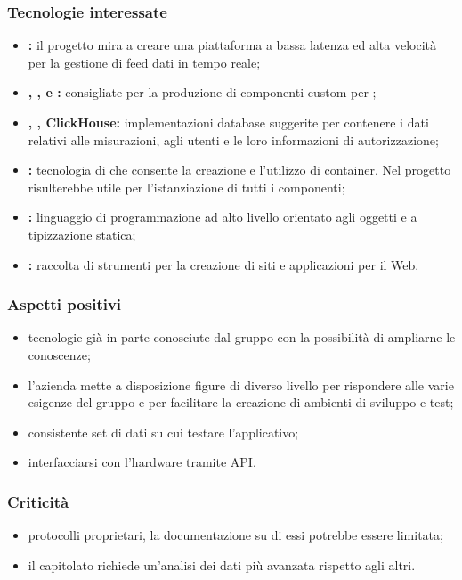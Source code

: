 	\subsubsection{Tecnologie interessate}
	\begin{itemize}
		\item \textbf{:} il progetto mira a creare una piattaforma a bassa latenza ed alta velocità per la gestione di feed dati in tempo reale;
		\item \textbf{, ,  e :}  consigliate per la produzione di componenti custom per ;
		\item \textbf{, , ClickHouse:} implementazioni database suggerite per contenere i dati relativi alle misurazioni, agli utenti e le loro informazioni di autorizzazione;
		\item \textbf{:} tecnologia di  che consente la creazione e l'utilizzo di container. Nel progetto risulterebbe utile per l'istanziazione di tutti i componenti;
		\item \textbf{:} linguaggio di programmazione ad alto livello orientato agli oggetti e a tipizzazione statica;
		\item \textbf{:} raccolta di strumenti  per la creazione di siti e applicazioni per il Web.
	\end{itemize}

	\subsubsection{Aspetti positivi}
	\begin{itemize}
		\item tecnologie già in parte conosciute dal gruppo con la possibilità di ampliarne le conoscenze;
		\item l'azienda mette a disposizione figure di diverso livello per rispondere alle varie esigenze del gruppo e per facilitare la creazione di ambienti di sviluppo e test;
		\item consistente set di dati su cui testare l'applicativo;
		\item interfacciarsi con l'hardware tramite API.
	\end{itemize}

	\subsubsection{Criticità}
	\begin{itemize}
		\item protocolli proprietari, la documentazione su di essi potrebbe essere limitata;
		\item il capitolato richiede un'analisi dei dati più avanzata rispetto agli altri.
	\end{itemize}

